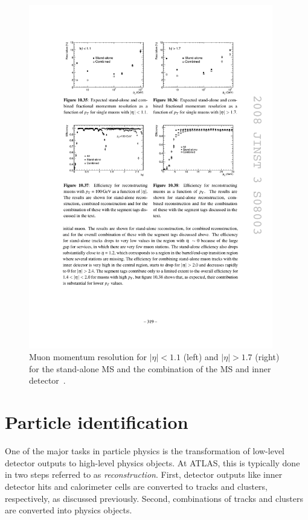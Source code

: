 \begin{figure}[tp]
  \centering
  \includegraphics[width=0.95\textwidth]{figures/performance/muon-resolution-IDvsCB}
  \caption{Muon momentum resolution for $|\eta| < 1.1$ (left) and $|\eta| > 1.7$ (right) for the stand-alone MS and the combination of the MS and inner detector~\cite{cern-jinst-atlas}.}
  \label{fig:atlas-detector-muons-resolution}
\end{figure}


\section{Particle identification}
\label{sec:particles}

One of the major tasks in particle physics is the transformation of low-level detector outputs to high-level physics objects. At ATLAS, this is typically done in two steps referred to as \textit{reconstruction}. First, detector outputs like inner detector hits and calorimeter cells are converted to tracks and clusters, respectively, as discussed previously. Second, combinations of tracks and clusters are converted into physics objects. 

